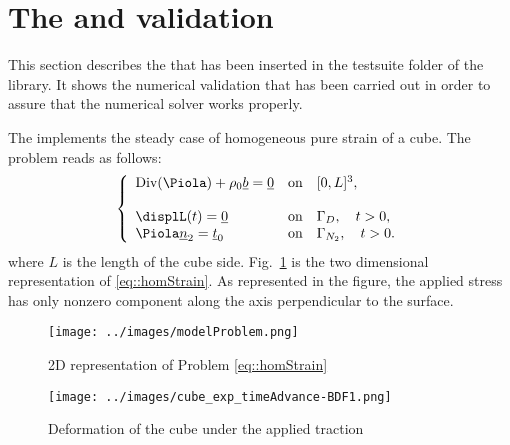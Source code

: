 \section{The \tSS and validation}
This section describes the \tSS that has been inserted in the testsuite folder of the library. It shows the numerical validation that has been carried out in order to assure that the numerical solver works properly.

The \tSS implements the steady case of homogeneous pure strain of a cube. The problem reads as follows:
\begin{equation}
\left\{
\begin{array}{lllllll}
  \displaystyle \text{Div}(\Piola) + \rho_0\underline{b} = \underline{0} & \text{on} \quad [0,L]^3,\\
  \\
  \displL(t)=\underline{0} & \text{on} \quad \Gamma_D, \quad t>0,\\
  \Piola\underline{n}_2=\underline{t}_0 & \text{on} \quad \Gamma_{N_2}, \quad t>0.\\
\end{array}\right.
\label{eq::homStrain}
\end{equation}
where $L$ is the length of the cube side. Fig.~\ref{fig::pureStrain} is the two dimensional representation of \eqref{eq::homStrain}. As represented in the figure, the applied stress has only nonzero component along the axis perpendicular to the surface. 
\begin{figure}
  \centering
  \texttt{[image: ../images/modelProblem.png]}
  \caption{2D representation of Problem \eqref{eq::homStrain}}
  \label{fig::pureStrain}
\end{figure}
\begin{figure}
  \centering
  \texttt{[image: ../images/cube\_exp\_timeAdvance-BDF1.png]}
  \caption{Deformation of the cube under the applied traction}
  \label{fig:displ}
\end{figure}

